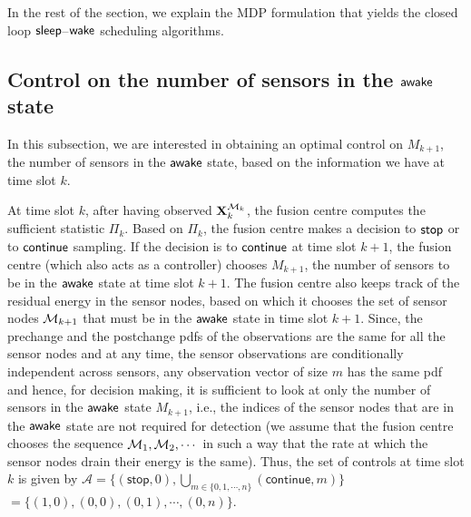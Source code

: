 \documentclass[journal]{IEEEtran}
\newcommand{\sleep}{{${\sf sleep }$}}
\newcommand{\wake}{{${\sf awake }$}}
\begin{document}
In the rest of the section, we explain the MDP formulation that yields
the closed loop \sleep--${\sf wake}$ scheduling algorithms. 


\subsection{Control on the number of sensors in the {\wake} state}
In this subsection, we are interested in obtaining an optimal control on 
$M_{k+1}$, the number of sensors in the {\wake} state, based on the
information we have at time slot $k$. 

At time slot $k$, after having
observed ${\bf X}^{{\cal M}_k}_k$, the fusion centre computes the
sufficient statistic $\Pi_k$. Based on $\Pi_k$, the fusion centre makes
a decision to ${\sf stop}$ or to ${\sf continue}$ sampling. If the decision
is to ${\sf continue}$ at time slot $k+1$, the fusion centre (which also
acts as a controller) chooses $M_{k+1}$, the number of sensors to be
in the {\wake} state at time slot $k+1$. The fusion centre also keeps
track of the residual energy in the sensor nodes, based on which it 
chooses the set of sensor nodes ${\cal M}_{k+1}$ that must be in the 
{\wake} state in time slot $k+1$. Since, the prechange and the 
postchange pdfs of the observations are the same for all the 
sensor nodes and at any time, the sensor observations are conditionally independent 
across sensors, any observation vector of size $m$ has the same pdf and 
hence, for decision making, it is sufficient to look at only the number 
of sensors in the {\wake} state $M_{k+1}$, i.e., the indices of the sensor nodes 
that are in the {\wake} state are not required for detection 
(we assume that the fusion centre chooses the sequence ${\cal M}_1, {\cal M}_2, \cdots$ in such a
way that the rate at which the sensor nodes drain their energy is the
same). Thus, the set of controls at time slot $k$ is given by 
${\mathcal A} = \bigg\{ (\mathsf{stop},0),
\bigcup_{m\in\{0,1,\cdots,n\}}(\mathsf{continue},m) \bigg\}$
$=\big\{(1,0), (0,0), (0,1), \cdots, (0,n)\big\}$.
\end{document}
